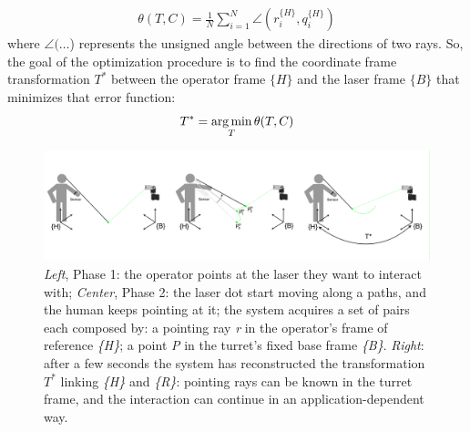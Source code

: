\begin{align}\label{eq:error}
	\theta(T,C)=\frac{1}{N}\sum_{i=1}^N\angle(r_i^{\{H\}},q_i^{\{H\}})
\end{align}
where $\angle(\dots$) represents the unsigned angle between the directions of two rays. So, the goal of the optimization procedure is to find the coordinate frame transformation $T^*$ between the operator frame $\{H\}$ and the laser frame $\{B\}$ that minimizes that error function:
\begin{align}
	T^*=\operatorname*{arg\,min}_T\theta(T,C)
\end{align}
\begin{figure}
	\centering
	\includegraphics[width=\textwidth]{img/pointingRelloc.png}%
	\caption{\emph{Left}, Phase 1: the operator points at the laser they want to interact with; \emph{Center}, Phase 2: the laser dot start moving along a paths, and the human keeps pointing at it; the system acquires a set of pairs each composed by: a pointing ray \emph{r} in the operator’s frame of reference \emph{\{H\}}; a point \emph{P} in the turret’s fixed base frame \emph{\{B\}}. \emph{Right}: after a few seconds the system has reconstructed the transformation $T^*$ linking \emph{\{H\}} and \emph{\{R\}}: pointing rays can be known in the turret frame, and the interaction can continue in an application-dependent way.}
	\label{fig:rellocExplained}
\end{figure}
